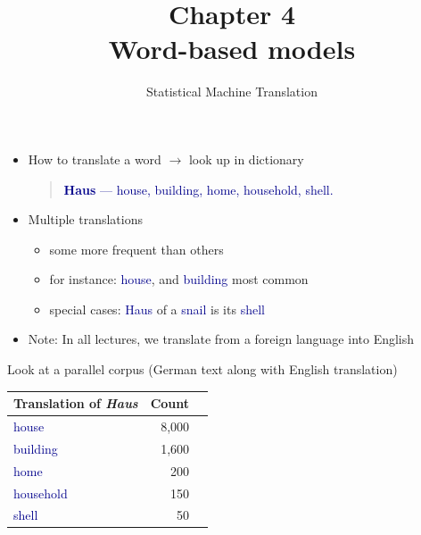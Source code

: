 \documentclass[landscape]{slides}
\newcommand{\example}[1]{\textcolor{darkblue}{\rm #1}}
\begin{document}
\title[Chapter 4: Word-Based Models]{Chapter 4\\[1cm] Word-based models}
\author[Philipp Koehn]{}
\date{Statistical Machine Translation}

\maketitle

\vspace{10mm}
\begin{itemize}
\item How to translate a word $\rightarrow$ look up in dictionary

\begin{quotation}
\example{{\bf Haus} --- house, building, home, household, shell.}
\end{quotation}

\item Multiple translations
\begin{itemize}
\item some more frequent than others
\item for instance: \example{house}, and \example{building} most common
\item special cases: \example{Haus} of a \example{snail} is its \example{shell}
\end{itemize}
\item Note: In all lectures, we translate from a foreign language into English
\end{itemize}


\vspace{20mm}
\begin{center}
Look at a parallel corpus (German text along with English translation)

\vspace{10mm}
\begin{tabular}{|l|r|r|} \hline
{\bf Translation of {\em Haus}} & {\bf Count} \\ \hline
\example{house}      & 8,000 \\ \hline
\example{building}   & 1,600 \\ \hline  
\example{home}       &  200 \\ \hline
\example{household}  &  150 \\ \hline
\example{shell}      &   50 \\ \hline
\end{tabular}
\end{center}
\end{document}
